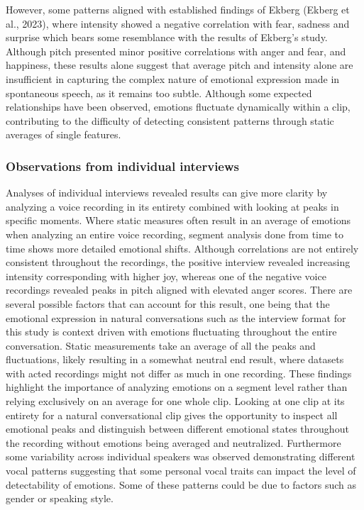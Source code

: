 However, some patterns aligned with established findings of Ekberg (Ekberg et al., 2023), where intensity showed a negative correlation with fear, sadness and surprise which bears some resemblance with the results of Ekberg’s study. Although pitch presented minor positive correlations with anger and fear, and happiness, these results alone suggest that average pitch and intensity alone are insufficient in capturing the complex nature of emotional expression made in spontaneous speech, as it remains too subtle. Although some expected relationships have been observed, emotions fluctuate dynamically within a clip, contributing to the difficulty of detecting consistent patterns through static averages of single features.

\subsubsection{Observations from individual interviews}
Analyses of individual interviews revealed results can give more clarity by analyzing a voice recording in its entirety combined with looking at peaks in specific moments. Where static measures often result in an average of emotions when analyzing an entire voice recording, segment analysis done from time to time shows more detailed emotional shifts. Although correlations are not entirely consistent throughout the recordings, the positive interview revealed increasing intensity corresponding with higher joy, whereas one of the negative voice recordings revealed peaks in pitch aligned with elevated anger scores. 
There are several possible factors that can account for this result, one being that the emotional expression in natural conversations such as the interview format for this study is context driven with emotions fluctuating throughout the entire conversation. Static measurements take an average of all the peaks and fluctuations, likely resulting in a somewhat neutral end result, where datasets with acted recordings might not differ as much in one recording.
These findings highlight the importance of analyzing emotions on a segment level rather than relying exclusively on an average for one whole clip. Looking at one clip at its entirety for a natural conversational clip gives the opportunity to inspect all emotional peaks and distinguish between different emotional states throughout the recording without emotions being averaged and neutralized.
Furthermore some variability across individual speakers was observed demonstrating different vocal patterns suggesting that some personal vocal traits can impact the level of detectability of emotions. Some of these patterns could be due to factors such as gender or speaking style.


